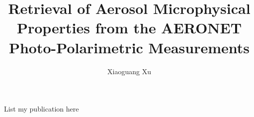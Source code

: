 \documentclass[phd, print]{nuthesis}
\begin{document}
\frontmatter

\title{Retrieval of Aerosol Microphysical Properties from the AERONET
Photo-Polarimetric Measurements}
\author{Xiaoguang Xu}
\maketitle

%


\tableofcontents*
\begin{onehalfspacing}
\listoffigures
\listoftables
\end{onehalfspacing}

\mainmatter


 
 
 
 
 


\backmatter

\appendix





\begin{onehalfspacing}


\end{onehalfspacing}

\newpage
\begin{listofpub}
  List my publication here
\end{listofpub}

\end{document}

